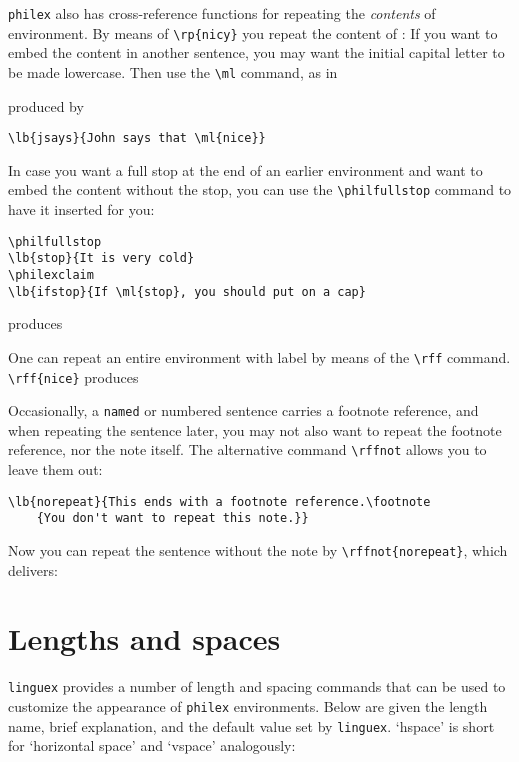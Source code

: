 \documentclass[11pt]{article}
\newcommand{\qut}[1]{`#1'}
\newcommand{\emp}{\emph}
\begin{document}
\verb+philex+ also has cross-reference  functions for repeating the \emp{contents} of environment. By means of \verb+\rp{nicy}+ you repeat the content of :  If you want to embed the content in another sentence, you may want the initial capital letter to be made lowercase. Then use the \verb+\ml+ command, as in

	produced by
\begin{verbatim}
\lb{jsays}{John says that \ml{nice}}
\end{verbatim}

In case you want a full stop at the end of an earlier environment and want to embed the content without the stop, you can use the \verb+\philfullstop+ command to have it inserted for you:




\begin{verbatim}
\philfullstop
\lb{stop}{It is very cold}
\philexclaim
\lb{ifstop}{If \ml{stop}, you should put on a cap}
\end{verbatim}
	produces
	
\philfullstop
{}
\philexclaim

\philempty

One can repeat an entire environment with label by means of the \verb+\rff+ command. \verb+\rff{nice}+ produces 

Occasionally, a \verb+named+ or  numbered sentence carries a footnote reference, and when repeating the sentence later, you may not also want to repeat the footnote reference, nor the note itself. The alternative command \verb+\rffnot+ allows you to leave them out:

\begin{verbatim}
\lb{norepeat}{This ends with a footnote reference.\footnote
	{You don't want to repeat this note.}}
\end{verbatim}

% 
% 
Now you can repeat the sentence without the note by 
\verb+\rffnot{norepeat}+, which delivers: 

\section{Lengths and spaces}\label{length}
\verb+linguex+ provides a number of length and spacing commands that can be used to customize the appearance of \verb+philex+ environments. Below are given the length name, brief explanation, and the default value set by \verb+linguex+. \qut{hspace} is short for \qut{horizontal space} and \qut{vspace} analogously:
\end{document}
